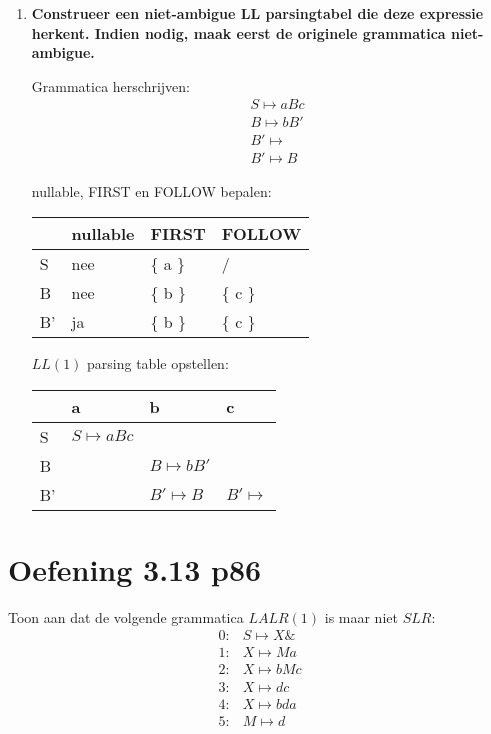 \begin{enumerate}
	\item \textbf{Construeer een niet-ambigue LL parsingtabel die deze expressie herkent. Indien nodig, maak eerst de originele grammatica niet-ambigue.}
		
		Grammatica herschrijven:
	\begin{equation*}
	\begin{split}
	& S \mapsto aBc \\
	& B \mapsto bB' \\
	& B' \mapsto  \\
	& B' \mapsto B 
	\end{split}
	\end{equation*}
	
	nullable, FIRST en FOLLOW bepalen:
	\begin{table}[ht]
		\centering
		\begin{tabular}{| l | l | l | l |}
			\hline
			& nullable & FIRST & FOLLOW \\
			\hline
			S & nee  & \{ a \}    & /	 			\\
			B & nee  & \{ b \}    & \{ c \}	\\
			B' & ja  & \{ b \}    & \{ c \}			\\
			\hline
		\end{tabular}
	\end{table}

	$LL(1)$ parsing table opstellen:
	
	\begin{table}[h]
		\centering
		\begin{tabular}{| l | l | l | l |}
			\hline
			  & a 					& b & c \\
			  \hline
			S & $S \mapsto aBc$	    &   &   \\
			B &   					& $B \mapsto bB'$  &   \\
			B' &  & $B' \mapsto B$ & $B' \mapsto$ \\
			\hline
		\end{tabular}
	\end{table}
	
\end{enumerate}

\section{Oefening 3.13 p86}
Toon aan dat de volgende grammatica $LALR(1)$ is maar niet $SLR$:
\begin{equation*}
\begin{split}
0 :& S \mapsto X\& \\
1 :& X \mapsto Ma \\
2 :& X \mapsto bMc \\
3 :& X \mapsto dc \\
4 :& X \mapsto bda \\
5 :& M \mapsto d
\end{split}
\end{equation*}

